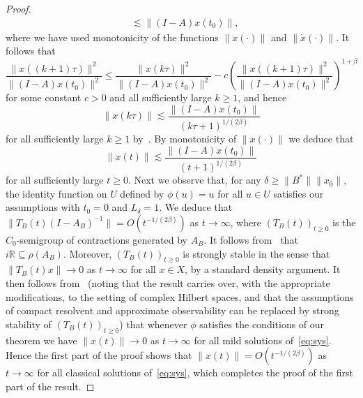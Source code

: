 \documentclass[10pt,a4paper]{amsart}
\newcommand{\RR}{\mathbb{R}}
\newcommand{\inv}{^{-1}}
\begin{document}
\begin{proof}
$$\begin{aligned}
&\lesssim\|(I-A)x(t_0)\|,
\end{aligned}
$$
where we have used monotonicity of the functions $\|x(\cdot)\|$ and $\|\dot{x}(\cdot)\|$. It follows that
$$\frac{\|x((k+1)\tau)\|^2}{\|(I-A)x(t_0)\|^2}\le\frac{\|x(k\tau)\|^2}{\|(I-A)x(t_0)\|^2}-c\left(\frac{\|x((k+1)\tau)\|^2}{\|(I-A)x(t_0)\|^2}\right)^{1+\beta}$$
for some constant $c>0$ and all sufficiently large $k\ge1$, and hence
$$\|x(k\tau)\|\lesssim \frac{\|(I-A)x(t_0)\|}{(k\tau+1)^{1/(2\beta)}}$$
for all sufficiently large $k\ge1$ by~\cite[Lem.~1.3.4]{AmmNic15book}. By monotonicity of $\|x(\cdot)\|$ we deduce that 
$$\|x(t)\|\lesssim \frac{\|(I-A)x(t_0)\|}{(t+1)^{1/(2\beta)}}$$
for all sufficiently large $t\ge0$. Next we observe that, for any $\delta\ge\|B^*\|\|x_0\|$, the identity function on $U$ defined by $\phi(u)=u$ for all $u\in U$ satisfies our assumptions  with $t_0=0$ and $L_\delta=1$. We deduce that
$\|T_B(t)(I-A_B)\inv\|=O(t^{-1/(2\beta)})$ as $t\to\infty$, where $(T_B(t))_{t\ge0}$ is the $C_0$-semigroup of contractions generated by $A_B$. It follows from~\cite[Thm.~1.1]{BatDuy08} that $i\RR\subseteq\rho(A_B)$. Moreover, $(T_B(t))_{t\ge0}$ is strongly stable in the sense that $\|T_B(t)x\|\to0$ as $t\to\infty$ for all $x\in X$, by a standard density argument. It then follows from~\cite[Thm.~2.2]{CurZwa16} (noting that the result carries over, with the appropriate modifications, to the setting of complex Hilbert spaces, and that the assumptions of compact resolvent and approximate observability can be replaced by strong stability of $(T_B(t))_{t\ge0}$) that whenever $\phi$ satisfies the conditions of our theorem we have $\|x(t)\|\to0$ as $t\to\infty$ for all  mild solutions of~\eqref{eq:sys}. Hence the first part of the proof shows that $\|x(t)\|=O(t^{-1/(2\beta)})$ as $t\to\infty$ for  all classical solutions of~\eqref{eq:sys}, which completes the proof of the first part of the result.


\end{proof}
\end{document}
